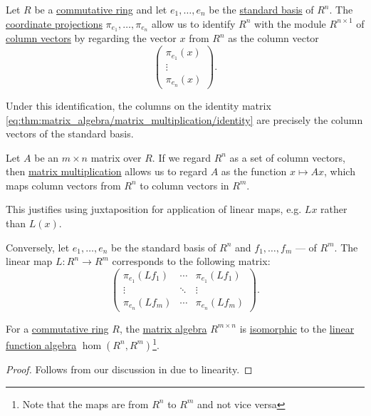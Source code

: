 \begin{remark}\label{rem:matrices_as_functions}
  Let \( R \) be a \hyperref[def:ring/commutative]{commutative ring} and let \( e_1, \ldots, e_n \) be the \hyperref[def:sequence_space]{standard basis} of \( R^n \). The \hyperref[def:basis_decomposition]{coordinate projections} \( \pi_{e_1}, \ldots, \pi_{e_n} \) allow us to identify \( R^n \) with the module \( R^{n \times 1} \) of \hyperref[def:array/column_vector]{column vectors} by regarding the vector \( x \) from \( R^n \) as the column vector
  \begin{equation*}
    \begin{pmatrix}
      \pi_{e_1}(x) \\
      \vdots \\
      \pi_{e_n}(x)
    \end{pmatrix}.
  \end{equation*}

  Under this identification, the columns on the identity matrix \eqref{eq:thm:matrix_algebra/matrix_multiplication/identity} are precisely the column vectors of the standard basis.

  Let \( A \) be an \( m \times n \) matrix over \( R \). If we regard \( R^n \) as a set of column vectors, then \hyperref[thm:matrix_algebra/matrix_multiplication]{matrix multiplication} allows us to regard \( A \) as the function \( x \mapsto Ax \), which maps column vectors from \( R^n \) to column vectors in \( R^m \).

  This justifies using juxtaposition for application of linear maps, e.g. \( Lx \) rather than \( L(x) \).

  Conversely, let \( e_1, \ldots, e_n \) be the standard basis of \( R^n \) and \( f_1, \ldots, f_m \) --- of \( R^m \). The linear map \( L: R^n \to R^m \) corresponds to the following matrix:
  \begin{equation*}
    \begin{pmatrix}
      \pi_{e_1}(L f_1) & \cdots & \pi_{e_1}(L f_1) \\
      \vdots           & \ddots & \vdots       \\
      \pi_{e_n}(L f_m) & \cdots & \pi_{e_n}(L f_m)
    \end{pmatrix}.
  \end{equation*}
\end{remark}

\begin{proposition}\label{thm:matrix_and_linear_function_algebras}
  For a \hyperref[def:ring/commutative]{commutative ring} \( R \), the \hyperref[thm:matrix_algebra]{matrix algebra} \( R^{m \times n} \) is \hyperref[def:algebra_over_semiring/homomorphism]{isomorphic} to the \hyperref[thm:functions_over_algebra]{linear function algebra} \( \hom(R^n, R^m) \)\footnote{Note that the maps are from \( R^n \) to \( R^m \) and not vice versa}.
\end{proposition}
\begin{proof}
  Follows from our discussion in  due to linearity.
\end{proof}

